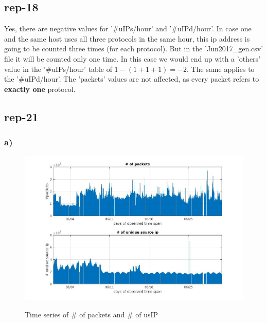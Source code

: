\subsection*{rep-18}
Yes, there are negative values for '\#uIPs/hour' and '\#uIPd/hour'. In case one and the same host uses all three protocols in the same hour, this ip address is going to be counted three times (for each protocol). But in the 'Jun2017\_gen.csv' file it will be counted only one time. In this case we would end up with a 'others' value in the '\#uIPs/hour' table of $1 - (1+1+1) = -2$. The same applies to the '\#uIPd/hour'. The 'packets' values are not affected, as every packet refers to \textbf{exactly one} protocol.

\subsection*{rep-21}
\subsubsection*{a)}
\begin{figure}[H]
\center
\includegraphics[width=.7\textwidth]{./chapters/plots/rep21a.jpg}\\
\caption{ Time series of \# of packets and \# of usIP }
\end{figure}

